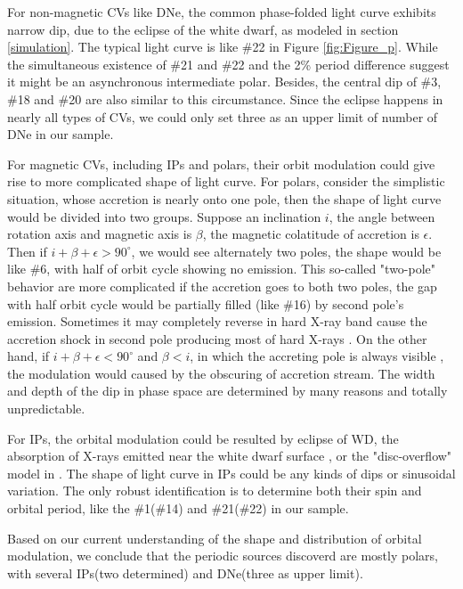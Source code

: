 \documentclass[twoside,twocolumn]{aastex63}
\begin{document}
For non-magnetic CVs like DNe, the common phase-folded light curve exhibits narrow dip, due to the eclipse of the white dwarf, as modeled in section \ref{simulation}. The typical light curve is like \#22 in Figure \ref{fig:Figure_p}. 	While the simultaneous existence of \#21 and \#22 and the 2\% period difference suggest it might be an asynchronous intermediate polar. Besides, the central dip of \#3, \#18 and \#20 are also similar to this circumstance. Since the eclipse happens in nearly all types of CVs, we could only set three as an upper limit of number of DNe in our sample.

For magnetic CVs, including IPs and polars, their orbit modulation could give rise to more complicated shape of light curve. For polars, consider the simplistic situation, whose accretion is nearly onto one pole, then the shape of light curve would be divided into two groups. Suppose an inclination $i$, the angle between rotation axis and magnetic axis is $\beta$, the magnetic colatitude of accretion is $\epsilon$. Then if $i+\beta+\epsilon > 90^{\circ}$, we would see alternately two poles, the shape would be like \#6, with half of orbit cycle showing no emission. This so-called "two-pole"  behavior are more complicated if the accretion goes to both two poles, the gap with half orbit cycle would be partially filled (like \#16) by second pole's emission. Sometimes it may completely reverse in hard X-ray band cause the accretion shock in second pole producing most of hard X-rays \citep{1985A&A...148L..14H}. On the other hand, if $i+\beta+\epsilon < 90^{\circ}$ and $\beta < i$, in which the accreting pole is always visible , the modulation would caused by the obscuring of accretion stream. The width and depth of the dip in phase space are determined by many reasons and totally unpredictable. 

For IPs, the orbital modulation could be resulted by eclipse of WD, the absorption of X-rays emitted near the white
dwarf surface \citep{1993MNRAS.260..299H}, or the "disc-overflow" model in \citep{1996MNRAS.280..937N}. The shape of light curve in IPs could be any kinds of dips or sinusoidal variation. The only robust identification is to determine both their spin and orbital period, like the \#1(\#14) and \#21(\#22) in our sample.

Based on our current understanding of the shape and distribution of orbital modulation, we conclude that the periodic sources discoverd are mostly polars, with several IPs(two determined) and DNe(three as upper limit). 
\end{document}
